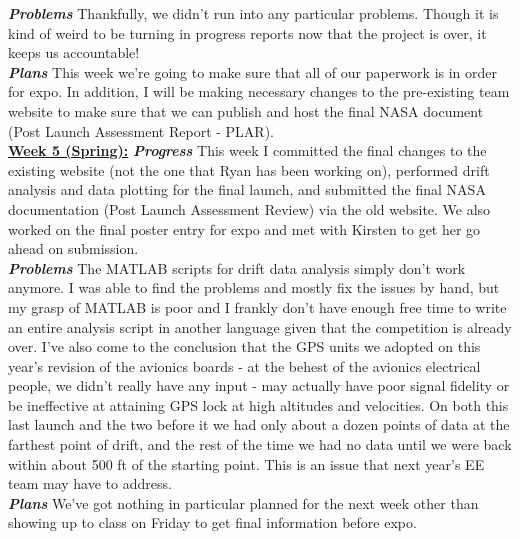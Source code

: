 \documentclass[onecolumn, draftclsnofoot, 10pt, compsoc]{IEEEtran}
\begin{document}
\textbf{\textit{{Problems}}}
\newline Thankfully, we didn't run into any particular problems. Though it is kind of weird to be turning in progress reports now that the project is over, it keeps us accountable! \\

\textbf{\textit{{Plans}}}
\newline This week we're going to make sure that all of our paperwork is in order for expo. In addition, I will be making necessary changes to the pre-existing team website to make sure that we can publish and host the final NASA document (Post Launch Assessment Report - PLAR). \\

\underline{\textbf{Week 5 (Spring):}}
\newline\textbf{\textit{{Progress}}}
\newline This week I committed the final changes to the existing website (not the one that Ryan has been working on), performed drift analysis and data plotting for the final launch, and submitted the final NASA documentation (Post Launch Assessment Review) via the old website. We also worked on the final poster entry for expo and met with Kirsten to get her go ahead on submission. \\

\textbf{\textit{{Problems}}}
\newline The MATLAB scripts for drift data analysis simply don't work anymore. I was able to find the problems and mostly fix the issues by hand, but my grasp of MATLAB is poor and I frankly don't have enough free time to write an entire analysis script in another language given that the competition is already over. I've also come to the conclusion that the GPS units we adopted on this year's revision of the avionics boards - at the behest of the avionics electrical people, we didn't really have any input - may actually have poor signal fidelity or be ineffective at attaining GPS lock at high altitudes and velocities. On both this last launch and the two before it we had only about a dozen points of data at the farthest point of drift, and the rest of the time we had no data until we were back within about 500 ft of the starting point. This is an issue that next year's EE team may have to address. \\

\textbf{\textit{{Plans}}}
\newline We've got nothing in particular planned for the next week other than showing up to class on Friday to get final information before expo. \\
\end{document}
